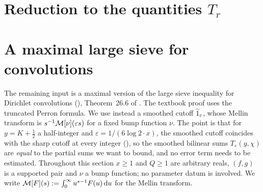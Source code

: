 


\section{Reduction to the quantities \texorpdfstring{$T_r$}{T\_r}}\label{sec:reduction-T}



\section{A maximal large sieve for convolutions}\label{sec:perron}

The remaining input is a maximal version of the large sieve inequality for Dirichlet convolutions
(), Theorem~26.6 of \cite{Koukoulopoulos2019}. The textbook proof
uses the truncated Perron formula. We use instead a smoothed cutoff $\widetilde{1}_\varepsilon$, whose Mellin
transform is $s^{-1}\mathcal{M}[\nu](\varepsilon s)$ for a fixed bump function $\nu$. The point is that for
$y = K + \tfrac12$ a half-integer and $\varepsilon = 1/(6\log 2 \cdot x)$, the smoothed cutoff coincides
with the sharp cutoff at every integer (), so the smoothed bilinear
sums $T_\varepsilon(y, \chi)$ are \emph{equal} to the partial sums we want to bound, and no error term
needs to be estimated. Throughout this section $x \ge 1$ and $Q \ge 1$ are arbitrary reals, $(f, g)$
is a supported pair and $\nu$ a bump function; no parameter datum is involved. We write
$\mathcal{M}[F](s) := \int_0^\infty u^{s-1} F(u)\,\mathrm{d}u$ for the Mellin transform.


